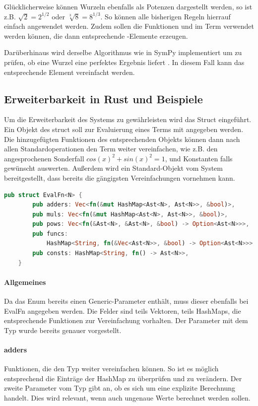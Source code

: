 \documentclass[11pt,a4paper, ngerman]{article}
\begin{document}
Glücklicherweise können Wurzeln ebenfalls als Potenzen dargestellt werden, so ist z.B. $\sqrt{2} = 2^{1/2}$ oder $\sqrt[3]{8} = 8^{1/3}$. So können alle bisherigen Regeln hierrauf einfach angewendet werden. Zudem sollen die Funktionen  und  im Term verwendet werden können, die dann entsprechende -Elemente erzeugen.

Darüberhinaus wird derselbe Algorithmus wie in SymPy implementiert um zu prüfen, ob eine Wurzel eine perfektes Ergebnis liefert \cite{SymPyNewton}. In diesem Fall kann das entsprechende Element vereinfacht werden.

\label{sec:kapErRustUndBei}
\subsection{Erweiterbarkeit in Rust und Beispiele}
Um die Erweiterbarkeit des Systems zu gewährleisten wird das Struct  eingeführt. Ein Objekt des struct soll zur Evaluierung eines Terms mit angegeben werden. Die hinzugefügten Funktionen des entsprechenden Objekts können dann nach allen Standardoperationen den Term weiter vereinfachen, wie z.B. den angesprochenen Sonderfall $cos(x)^2+sin(x)^2 = 1$, und Konstanten falls gewünscht auswerten. Außerdem wird ein Standard-Objekt vom System bereitgestellt, dass bereits die gängigsten Vereinfachungen vornehmen kann.

\begin{lstlisting}[language=rust, caption={Defintion EvalFn}]
    pub struct EvalFn<N> {
        pub adders: Vec<fn(&mut HashMap<Ast<N>, Ast<N>>, &bool)>,
        pub muls: Vec<fn(&mut HashMap<Ast<N>, Ast<N>>, &bool)>,
        pub pows: Vec<fn(&Ast<N>, &Ast<N>, &bool) -> Option<Ast<N>>>,
        pub funcs: 
            HashMap<String, fn(&Vec<Ast<N>>, &bool) -> Option<Ast<N>>>,
        pub consts: HashMap<String, fn() -> Ast<N>>,
    }
\end{lstlisting}

\paragraph{Allgemeines} Da das Enum  bereits einen Generic-Parameter enthält, muss dieser ebenfalls bei EvalFn angegeben werden. Die Felder sind teils Vektoren, teils HashMaps, die entsprechende Funktionen zur Vereinfachung vorhalten. Der Parameter mit dem Typ  wurde bereits genauer vorgestellt.

\paragraph{adders} Funktionen, die den Typ  weiter vereinfachen können. So ist es möglich entsprechend die Einträge der HashMap zu überprüfen und zu verändern. Der zweite Parameter vom Typ  gibt an, ob es sich um eine explizite Berechnung handelt. Dies wird relevant, wenn auch ungenaue Werte berechnet werden sollen.
\end{document}
